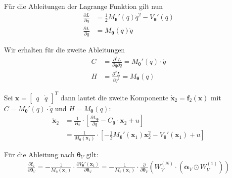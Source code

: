 \documentclass[a4paper, 12pt]{scrartcl}
\begin{document}
Für die Ableitungen der Lagrange Funktion gilt nun
\begin{align*}
    \frac{\partial L}{\partial q} 
    &= 
    \frac{1}{2} M_{\bm{\theta}}'(q) \dot{q}^2 - V_{\bm{\theta}}'(q)
    \\
    \frac{\partial L}{\partial \dot{q}} 
    &= 
    M_{\bm{\theta}}(q) \dot{q} 
\end{align*}

Wir erhalten für die zweite Ableitungen
\begin{align*}
    C
    &=
    \frac{\partial^2 L}{\partial q \partial \dot{q}}
    =
    M_{\bm{\theta}}'(q) \cdot \dot{q}
    \\
    H
    &=
    \frac{\partial^2 L}{\partial \dot{q}^2}
    =
    M_{\bm{\theta}}(q)
\end{align*}

Sei $\bm{x} = \begin{bmatrix} q & \dot{q} \end{bmatrix}^T$ dann lautet die
zweite Komponente $\bm{\dot{x}}_2=\bm{f}_2 (\bm{x})$ mit
$C = M_{\bm{\theta}}'(q) \cdot \dot{q}$ 
und $H = M_{\bm{\theta}}(q)$:
\begin{align}
    \bm{\dot{x}}_2
    &=
    \frac{1}{H_{\bm{\theta}}} \cdot 
    \left[
        \frac{\partial L_{\bm{\theta}}}{\partial q} 
        -
        C_{\bm{\theta}} \cdot \bm{x}_2 + u
    \right]
    \nonumber
    \\
    &=
    \frac{1}{M_{\bm{\theta}}(\bm{x}_1)} 
    \cdot 
    \left[
        - \frac{1}{2} M_{\bm{\theta}}'(\bm{x}_1) \bm{x}_2^2 
        - V_{\bm{\theta}}'(\bm{x}_1) + u
    \right]
    \label{eq:ELE_structured_L}
\end{align}


Für die Ableitung nach $\bm{\theta}_V$ gilt:
\begin{align*}
    \frac{\partial \bm{f}_2}{\partial \bm{\theta}_V}
    =
    - \frac{1}{M_{\bm{\theta}}(\bm{x}_1)} 
    \cdot 
    \frac{\partial V_{\bm{\theta}}'(\bm{x}_1)}{\partial \bm{\theta}_V}
    =
    - \frac{1}{M_{\bm{\theta}}(\bm{x}_1)} 
    \cdot 
    \frac{\partial}{\partial \bm{\theta}_V}
    \left(
        W_V^{(N)} \cdot \left(\bm{\alpha}_V \odot W_V^{(1)}\right)
    \right)
\end{align*}
\end{document}
